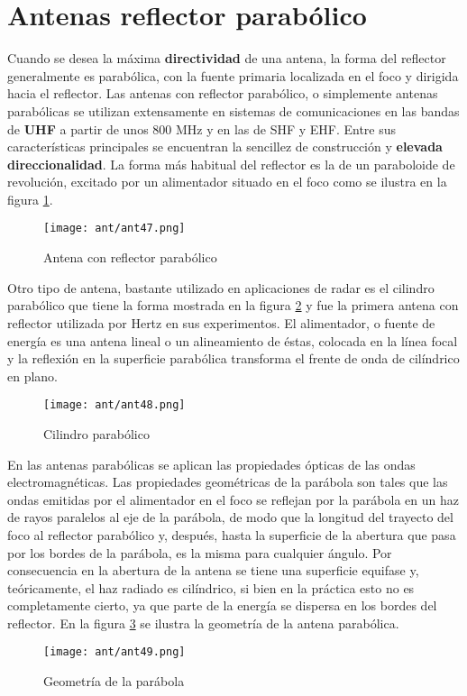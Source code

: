 \documentclass[
	12pt, %
	fleqn, %
	a4paper, %
	oneside, %
]{LegrandOrangeBook}
\begin{document}
\section{Antenas reflector parabólico}
Cuando se desea la máxima \textbf{directividad} de una antena, la forma del reflector generalmente es parabólica, con la fuente primaria localizada en el foco y dirigida hacia el reflector. Las antenas con reflector parabólico, o simplemente antenas parabólicas se utilizan extensamente en sistemas de comunicaciones en las bandas de \textbf{UHF} a partir de unos 800 MHz y en las de SHF y EHF. Entre sus características principales se encuentran la sencillez de construcción y \textbf{elevada direccionalidad}. La forma más habitual del reflector es la de un paraboloide de revolución, excitado por un alimentador situado en el foco como se ilustra en la figura \ref{fig:ant par}.
\begin{figure}[H]
\centering
\texttt{[image: ant/ant47.png]}
\caption{Antena con reflector parabólico}
\label{fig:ant par}
\end{figure}
Otro tipo de antena, bastante utilizado en aplicaciones de radar es el cilindro parabólico que tiene la forma mostrada en la figura \ref{fig:ref cilin} y fue la primera antena con reflector utilizada por Hertz en sus experimentos. El alimentador, o fuente de energía es una antena lineal o un alineamiento de éstas, colocada en la línea focal y la reflexión en la superficie parabólica transforma el frente de onda de cilíndrico en plano.
\begin{figure}[H]
\centering
\texttt{[image: ant/ant48.png]}
\caption{Cilindro parabólico}
\label{fig:ref cilin}
\end{figure}
En las antenas parabólicas se aplican las propiedades ópticas de las ondas electromagnéticas. Las propiedades geométricas de la parábola son tales que las ondas emitidas por el alimentador en el foco se reflejan por la parábola en un haz de rayos paralelos al eje de la parábola, de modo que la longitud del trayecto del foco al reflector parabólico y, después, hasta la superficie de la abertura que pasa por los bordes de la parábola, es la misma para cualquier ángulo. Por consecuencia en la abertura de la antena se tiene una superficie equifase y, teóricamente, el haz radiado es cilíndrico, si bien en la práctica esto no es completamente cierto, ya que parte de la energía se dispersa en los bordes del reflector. En la figura \ref{fig:geo para} se ilustra la geometría de la antena parabólica.
\begin{figure}[H]
\centering
\texttt{[image: ant/ant49.png]}
\caption{Geometría de la parábola}
\label{fig:geo para}
\end{figure}
\end{document}
